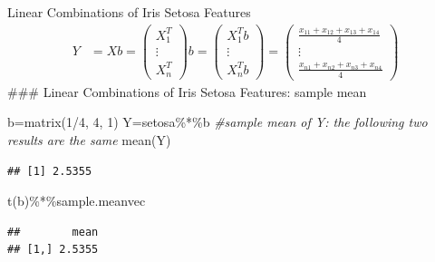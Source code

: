 \documentclass[
  ignorenonframetext,
]{beamer}
\newenvironment{Shaded}{\begin{snugshade}}{\end{snugshade}}
\newcommand{\CommentTok}[1]{\textcolor[rgb]{0.56,0.35,0.01}{\textit{#1}}}
\newcommand{\DecValTok}[1]{\textcolor[rgb]{0.00,0.00,0.81}{#1}}
\newcommand{\FunctionTok}[1]{\textcolor[rgb]{0.00,0.00,0.00}{#1}}
\newcommand{\NormalTok}[1]{#1}
\newcommand{\OtherTok}[1]{\textcolor[rgb]{0.56,0.35,0.01}{#1}}
\newcommand{\SpecialCharTok}[1]{\textcolor[rgb]{0.00,0.00,0.00}{#1}}
\begin{document}
\begin{frame}[fragile]{Linear Combinations of Iris Setosa Features}
\protect\hypertarget{linear-combinations-of-iris-setosa-features-1}{}
\[\begin{aligned}
Y&=Xb=
\begin{pmatrix} X_1^T \\ \vdots \\ X_n^T  \end{pmatrix} b
 =
\begin{pmatrix} X_1^Tb \\ \vdots \\ X_n^Tb  \end{pmatrix}
=\begin{pmatrix} \frac{x_{11} +x_{12} + x_{13} + x_{14}}{4}  \\ 
\vdots \\ 
 \frac{x_{n1} +x_{n2} + x_{n3} + x_{n4}}{4}   \end{pmatrix}
\end{aligned}
\] \#\#\# Linear Combinations of Iris Setosa Features: sample mean

\begin{Shaded}
\begin{Highlighting}[]
\NormalTok{b}\OtherTok{=}\FunctionTok{matrix}\NormalTok{(}\DecValTok{1}\SpecialCharTok{/}\DecValTok{4}\NormalTok{, }\DecValTok{4}\NormalTok{, }\DecValTok{1}\NormalTok{)}
\NormalTok{Y}\OtherTok{=}\NormalTok{setosa}\SpecialCharTok{\%*\%}\NormalTok{b}
\CommentTok{\#sample mean of Y: the following two results are the same}
\FunctionTok{mean}\NormalTok{(Y)}
\end{Highlighting}
\end{Shaded}

\begin{verbatim}
## [1] 2.5355
\end{verbatim}

\begin{Shaded}
\begin{Highlighting}[]
\FunctionTok{t}\NormalTok{(b)}\SpecialCharTok{\%*\%}\NormalTok{sample.meanvec}
\end{Highlighting}
\end{Shaded}

\begin{verbatim}
##        mean
## [1,] 2.5355
\end{verbatim}
\end{frame}
\end{document}
